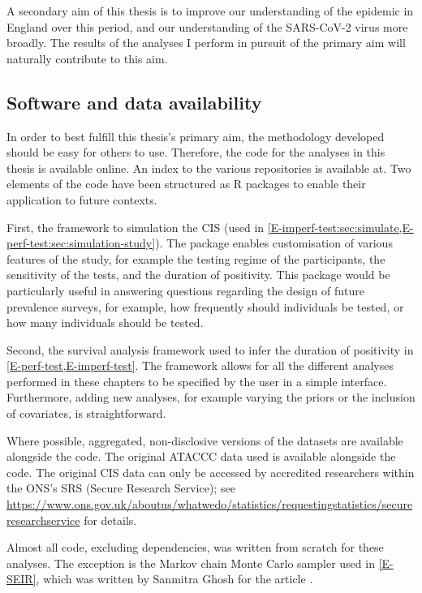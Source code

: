 \documentclass[thesis.tex]{subfiles}
\begin{document}
A secondary aim of this thesis is to improve our understanding of the epidemic in England over this period, and our understanding of the SARS-CoV-2 virus more broadly.
The results of the analyses I perform in pursuit of the primary aim will naturally contribute to this aim.

\subsection{Software and data availability}

In order to best fulfill this thesis's primary aim, the methodology developed should be easy for others to use.
Therefore, the code for the analyses in this thesis is available online.
An index to the various repositories is available at.
Two elements of the code have been structured as R packages to enable their application to future contexts.

First, the framework to simulation the CIS (used in \cref{E-imperf-test:sec:simulate,E-perf-test:sec:simulation-study}).
The package enables customisation of various features of the study, for example the testing regime of the participants, the sensitivity of the tests, and the duration of positivity.
This package would be particularly useful in answering questions regarding the design of future prevalence surveys, for example, how frequently should individuals be tested, or how many individuals should be tested.

Second, the survival analysis framework used to infer the duration of positivity in \cref{E-perf-test,E-imperf-test}.
The framework allows for all the different analyses performed in these chapters to be specified by the user in a simple interface.
Furthermore, adding new analyses, for example varying the priors or the inclusion of covariates, is straightforward.

Where possible, aggregated, non-disclosive versions of the datasets are available alongside the code.
The original ATACCC data used is available alongside the code.
The original CIS data can only be accessed by accredited researchers within the ONS's SRS (Secure Research Service); see \url{https://www.ons.gov.uk/aboutus/whatwedo/statistics/requestingstatistics/secureresearchservice} for details.

Almost all code, excluding dependencies, was written from scratch for these analyses.
The exception is the Markov chain Monte Carlo sampler used in \cref{E-SEIR}, which was written by Sanmitra Ghosh for the article \textcite{ghoshApproximate}.
\end{document}
